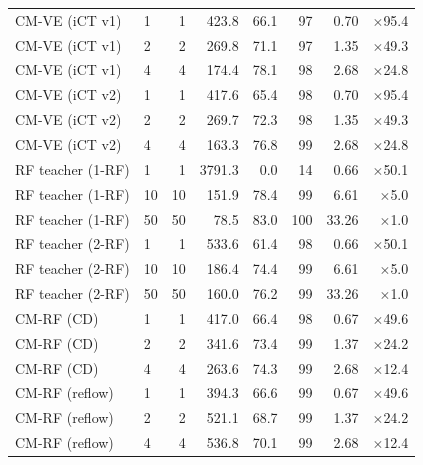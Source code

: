 \documentclass{article}
\begin{document}
\begin{table}[H]
\begin{tabular}{llrrrrrr}
    \midrule
    CM-VE (iCT v1) & 1 & 1 & 423.8 & 66.1 & 97 & 0.70 & $\times$95.4 \\
    CM-VE (iCT v1) & 2 & 2 & 269.8 & 71.1 & 97 & 1.35 & $\times$49.3 \\
    CM-VE (iCT v1) & 4 & 4 & 174.4 & 78.1 & 98 & 2.68 & $\times$24.8 \\
    \midrule
    CM-VE (iCT v2) & 1 & 1 & 417.6 & 65.4 & 98 & 0.70 & $\times$95.4 \\
    CM-VE (iCT v2) & 2 & 2 & 269.7 & 72.3 & 98 & 1.35 & $\times$49.3 \\
    CM-VE (iCT v2) & 4 & 4 & 163.3 & 76.8 & 99 & 2.68 & $\times$24.8 \\
    \midrule
    RF teacher (1-RF) & 1 & 1 & 3791.3 & 0.0 & 14 & 0.66 & $\times$50.1 \\
    RF teacher (1-RF) & 10 & 10 & 151.9 & 78.4 & 99 & 6.61 & $\times$5.0 \\
    RF teacher (1-RF) & 50 & 50 & 78.5 & 83.0 & 100 & 33.26 & $\times$1.0 \\
    RF teacher (2-RF) & 1 & 1 & 533.6 & 61.4 & 98 & 0.66 & $\times$50.1 \\
    RF teacher (2-RF) & 10 & 10 & 186.4 & 74.4 & 99 & 6.61 & $\times$5.0 \\
    RF teacher (2-RF) & 50 & 50 & 160.0 & 76.2 & 99 & 33.26 & $\times$1.0 \\
    \midrule
    CM-RF (CD) & 1 & 1 & 417.0 & 66.4 & 98 & 0.67 & $\times$49.6 \\
    CM-RF (CD) & 2 & 2 & 341.6 & 73.4 & 99 & 1.37 & $\times$24.2 \\
    CM-RF (CD) & 4 & 4 & 263.6 & 74.3 & 99 & 2.68 & $\times$12.4 \\
    \midrule
    CM-RF (reflow) & 1 & 1 & 394.3 & 66.6 & 99 & 0.67 & $\times$49.6 \\
    CM-RF (reflow) & 2 & 2 & 521.1 & 68.7 & 99 & 1.37 & $\times$24.2 \\
    CM-RF (reflow) & 4 & 4 & 536.8 & 70.1 & 99 & 2.68 & $\times$12.4 \\
    \bottomrule
  \end{tabular}
\end{table}
\end{document}
